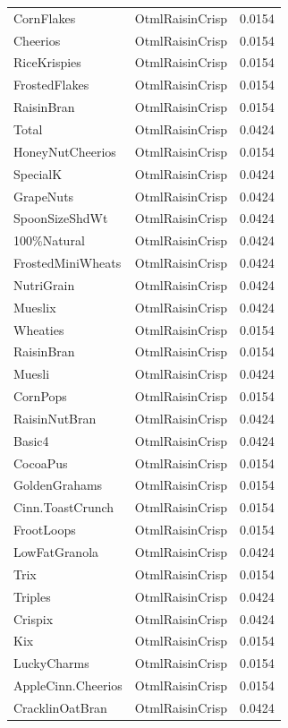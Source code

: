 \begin{table}[!htbp]
\begin{tabular}{lll}
\\
CornFlakes & OtmlRaisinCrisp & 0.0154
\\
Cheerios & OtmlRaisinCrisp & 0.0154
\\
RiceKrispies & OtmlRaisinCrisp & 0.0154
\\
FrostedFlakes & OtmlRaisinCrisp & 0.0154
\\
RaisinBran & OtmlRaisinCrisp & 0.0154
\\
Total & OtmlRaisinCrisp & 0.0424
\\
HoneyNutCheerios & OtmlRaisinCrisp & 0.0154
\\
SpecialK & OtmlRaisinCrisp & 0.0424
\\
GrapeNuts & OtmlRaisinCrisp & 0.0424
\\
SpoonSizeShdWt & OtmlRaisinCrisp & 0.0424
\\
100\%Natural & OtmlRaisinCrisp & 0.0424
\\
FrostedMiniWheats & OtmlRaisinCrisp & 0.0424
\\
NutriGrain & OtmlRaisinCrisp & 0.0424
\\
Mueslix & OtmlRaisinCrisp & 0.0424
\\
Wheaties & OtmlRaisinCrisp & 0.0154
\\
RaisinBran & OtmlRaisinCrisp & 0.0154
\\
Muesli & OtmlRaisinCrisp & 0.0424
\\
CornPops & OtmlRaisinCrisp & 0.0154
\\
RaisinNutBran & OtmlRaisinCrisp & 0.0424
\\
Basic4 & OtmlRaisinCrisp & 0.0424
\\
CocoaPus & OtmlRaisinCrisp & 0.0154
\\
GoldenGrahams & OtmlRaisinCrisp & 0.0154
\\
Cinn.ToastCrunch & OtmlRaisinCrisp & 0.0154
\\
FrootLoops & OtmlRaisinCrisp & 0.0154
\\
LowFatGranola & OtmlRaisinCrisp & 0.0424
\\
Trix & OtmlRaisinCrisp & 0.0154
\\
Triples & OtmlRaisinCrisp & 0.0424
\\
Crispix & OtmlRaisinCrisp & 0.0424
\\
Kix & OtmlRaisinCrisp & 0.0154
\\
LuckyCharms & OtmlRaisinCrisp & 0.0154
\\
AppleCinn.Cheerios & OtmlRaisinCrisp & 0.0154
\\
CracklinOatBran & OtmlRaisinCrisp & 0.0424
\\

\end{tabular}
\end{table}
